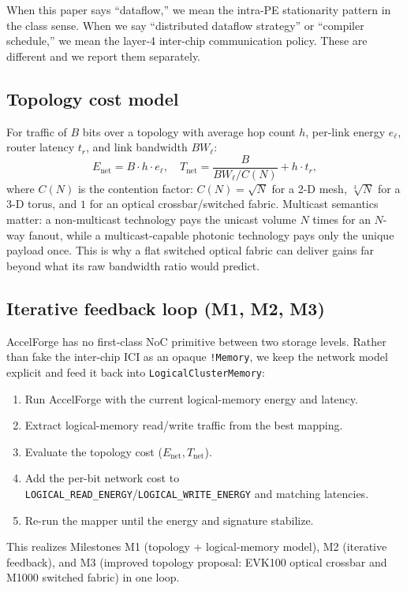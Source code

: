 \documentclass[conference]{IEEEtran}
\newcommand{\code}[1]{\texttt{\scriptsize #1}}
\begin{document}
When this paper says ``dataflow,'' we mean the intra-PE stationarity
pattern in the class sense. When we say ``distributed dataflow
strategy'' or ``compiler schedule,'' we mean the layer-4 inter-chip
communication policy. These are different and we report them
separately.

\subsection{Topology cost model}
\label{sec:network}
For traffic of \(B\) bits over a topology with average hop count
\(h\), per-link energy \(e_\ell\), router latency \(t_r\), and link
bandwidth \(BW_\ell\):
\[
E_{\text{net}} = B \cdot h \cdot e_\ell, \quad
T_{\text{net}} = \frac{B}{BW_\ell / C(N)} + h \cdot t_r,
\]
where \(C(N)\) is the contention factor: \(C(N)=\sqrt{N}\) for a 2-D
mesh, \(\sqrt[3]{N}\) for a 3-D torus, and \(1\) for an optical
crossbar/switched fabric. Multicast semantics matter: a
non-multicast technology pays the unicast volume $N$ times for an
$N$-way fanout, while a multicast-capable photonic technology pays
only the unique payload once. This is why a flat switched optical
fabric can deliver gains far beyond what its raw bandwidth ratio
would predict.

\subsection{Iterative feedback loop (M1, M2, M3)}
\label{sec:iter}
AccelForge has no first-class NoC primitive between two storage
levels. Rather than fake the inter-chip ICI as an opaque
\code{!Memory}, we keep the network model explicit and feed it back
into \code{LogicalClusterMemory}:
\begin{enumerate}
    \item Run AccelForge with the current logical-memory energy and
    latency.
    \item Extract logical-memory read/write traffic from the best
    mapping.
    \item Evaluate the topology cost
    (\(E_{\text{net}}, T_{\text{net}}\)).
    \item Add the per-bit network cost to
    \code{LOGICAL\_READ\_ENERGY}/\code{LOGICAL\_WRITE\_ENERGY} and
    matching latencies.
    \item Re-run the mapper until the energy and signature
    stabilize.
\end{enumerate}
This realizes Milestones M1 (topology + logical-memory model),
M2 (iterative feedback), and M3 (improved topology proposal:
EVK100 optical crossbar and M1000 switched fabric) in one loop.
\end{document}
